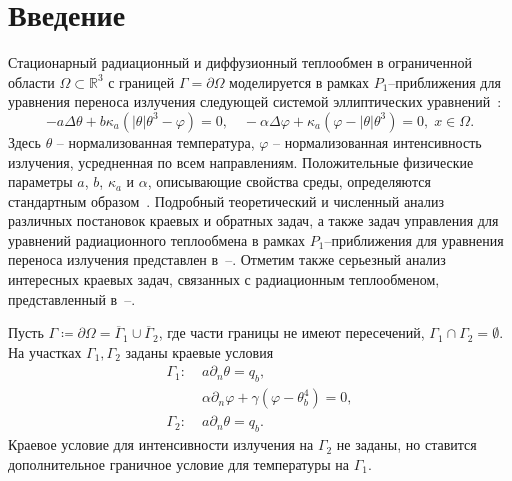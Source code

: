 \section{Введение}\label{sec:intro}
Стационарный радиационный и диффузионный теплообмен в ограниченной области
$\Omega \subset \mathbb{R}^3$ с границей $\Gamma = \partial \Omega$ моделируется в рамках  $P_1$--приближения для уравнения
переноса излучения следующей системой эллиптических уравнений~\cite{Pinnau07, AMC-13, Kovt14-1}:
\begin{equation}
    \label{eq:model}
    - a \Delta\theta + b\kappa_a(|\theta|\theta^3- \varphi)=0,   \quad
    - \alpha \Delta \varphi + \kappa_a(\varphi-|\theta|\theta^3)=0,\; x\in\Omega.
\end{equation}
Здесь $\theta$ -- нормализованная температура, $\varphi$ -- нормализованная интенсивность излучения,
усредненная по всем направлениям.
Положительные физические параметры $a$, $b$, $\kappa_a$ и $\alpha$, описывающие
свойства среды, определяются стандартным образом~\cite{Kovt14-1}.
Подробный теоретический и численный анализ различных постановок краевых и обратных задач,
а также задач управления для уравнений радиационного теплообмена
в рамках $P_1$--приближения для уравнения переноса излучения представлен в~\cite{Pinnau07}--\cite{CMMP20}.
Отметим также серьезный анализ интересных краевых задач, связанных с радиационным теплообменом,
представленный в~\cite{Amosov05}--\cite{Amosov20}.

Пусть $\Gamma \coloneqq \partial \Omega =\overline{\Gamma}_1 \cup \overline{\Gamma}_2$,
где части границы не имеют пересечений, $\Gamma_1 \cap \Gamma_2 =  \emptyset$.
На участках $\Gamma_1, \Gamma_2$ заданы краевые условия
\begin{equation}
    \label{eq:boundary}
    \begin{aligned}
        \Gamma_1:\; &a \partial_n \theta = q_b, \\
        &\alpha\partial_n\varphi + \gamma (\varphi - \theta_b ^4 ) = 0, \\
        \Gamma_2:\; & a \partial_n \theta = q_b.
    \end{aligned}
\end{equation}
Краевое условие для интенсивности излучения на $\Gamma_2$ не заданы, но ставится дополнительное
граничное условие для температуры на $\Gamma_1$.


